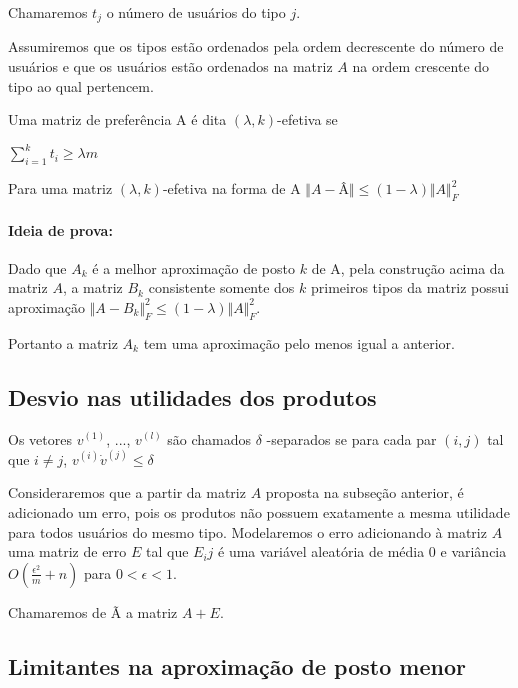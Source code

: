 \documentclass[a4paper,10pt]{article}
\begin{document}
Chamaremos $t_j$ o número de usuários do tipo $j$. 

Assumiremos que os tipos estão ordenados pela ordem decrescente do número de usuários e que os usuários estão ordenados na matriz $A$ na ordem crescente do tipo ao qual pertencem.  

\begin{definicao} \label{definicao:box} Uma matriz de preferência A é dita $(\lambda,k)$-efetiva se 

$\sum^k_{i=1} t_i \geq \lambda m$
\end{definicao}

\begin{lema} \label{lema:box}
Para uma matriz $(\lambda,k)$-efetiva na forma de A  $\Vert A - $Â$ \Vert \le ( 1 - \lambda ) \Vert A \Vert^2_F$ 
\end{lema}
\paragraph{Ideia de prova:}

Dado que $A_k$ é a melhor aproximação de posto $k$ de A, pela construção acima da matriz $A$, a matriz $B_k$ consistente somente dos $k$ primeiros tipos da matriz possui aproximação 
$\Vert A - B_k\Vert^2_F \leq ( 1 - \lambda ) \Vert A \Vert^2_F$.

Portanto a matriz $A_k$ tem uma aproximação pelo menos igual a anterior.

\subsection{Desvio nas utilidades dos produtos}


\begin{definicao} \label{definicao:box} Os vetores $v^{(1)}$, ..., $v^{(l)}$ são chamados $\delta $ -separados se para
cada par $(i,j)$ tal que $i \neq j$, $v^{(i)} \dot v^{(j)} \leq \delta $
\end{definicao}
Consideraremos que a partir da matriz $A$ proposta na subseção anterior, é adicionado um erro, pois os produtos não possuem exatamente a mesma utilidade para todos usuários do mesmo tipo. Modelaremos o erro adicionando à matriz $A$ uma matriz de erro $E$ tal que $E_ij$ é uma variável aleatória de média 0 e variância $O(\frac{\epsilon^2}{m} + n )$ para $0 < \epsilon < 1$.

Chamaremos de Ã a matriz $ A + E $.

\subsection{Limitantes na aproximação de posto menor}
\end{document}
